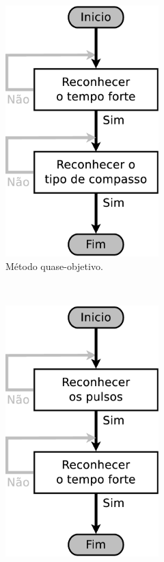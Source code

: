 \begin{figure}[h]
    \centering 
\begin{subfigure}[c]{0.45\textwidth}
\centering 
\includegraphics[width=0.65\textwidth]{chapters/cap-musicalidade-percepcion/dancanopulso1.eps}
\caption{Método quase-objetivo.}
\label{fig:fluxodancanopulso1}
\end{subfigure}
~%
\begin{subfigure}[c]{0.45\textwidth}
\centering 
\includegraphics[width=0.65\textwidth]{chapters/cap-musicalidade-percepcion/dancanopulso2.eps}

\end{subfigure}
\end{figure}
